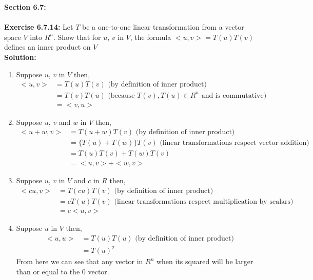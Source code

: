 \documentclass{amsart}
\begin{document}
{\huge\textbf{Section 6.7:}}\\\\
\noindent\textbf{Exercise 6.7.14: }Let $T$ be a one-to-one linear transformation from a vector space $V$ into $R^n$. Show that for $u$, $v$ in $V$, the formula $<u,v> = T(u)T(v)$ defines an inner product on $V$\\
\noindent \textbf{Solution: }
\begin {enumerate}

\item Suppose $u$, $v$ in $V$ then,
\begin{align*}
<u,v> &= T(u)T(v) \text{ (by definition of inner product)} \\
&= T(v)T(u) \text{ (because $T(v), T(u) \in R^n$ and is commutative) } \\
&= <v,u>
\end{align*}
\vspace{.25in}


\item Suppose $u$, $v$ and $w$ in $V$ then,
\begin{align*}
<u+w,v> &= T(u+w)T(v) \text{ (by definition of inner product)} \\
&= \{T(u)+T(w)\}T(v) \text{ (linear transformations respect vector addition) } \\
&= T(u)T(v)+T(w)T(v)\\
&= <u,v> + <w,v>
\end{align*}
\vspace{.25in}


\item Suppose $u$, $v$ in $V$ and $c$ in $R$ then,
\begin{align*}
<cu,v> &= T(cu)T(v) \text{ (by definition of inner product)} \\
&= cT(u)T(v) \text{ (linear transformations respect multiplication by scalars) } \\
&= c<u,v>
\end{align*}
\vspace{.25in}


\item Suppose $u$ in $V$ then,
\begin{align*}
<u,u> &= T(u)T(u) \text{ (by definition of inner product)} \\
&= T(u)^2
\end{align*}
From here we can see that any vector in $R^n$ when its squared will be larger than or equal to the 0 vector.\\
\vspace{.25in}


\end{enumerate}
\end{document}
